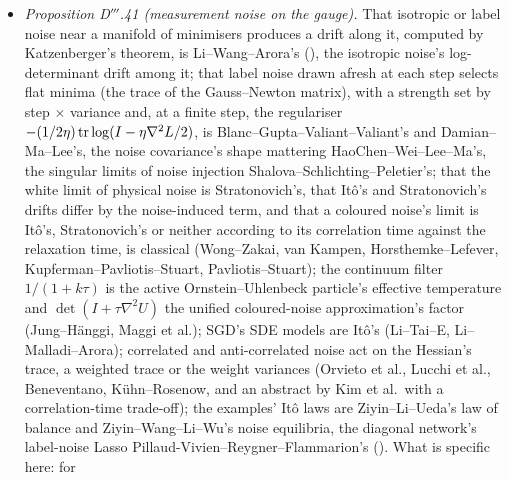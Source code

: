 \begin{itemize}
    replaces the gauge's saturation by a non-degenerate wall, so the entropic drift of
    \hyperref[res:thmDppp:37]{Proposition D$'''$.37} ends at the vertices of the representable polytope (at leading
    order: the envelope is $C^{1,1}$, so the drift's description has a boundary layer at the faces), and keeps
    \hyperref[res:thmDppp:38]{Proposition D$'''$.38}'s selection of $W^\sharp$; it leaves the deterministic objects
    inside the box unchanged, not the stationary averages, which weigh the plateau where it meets the box. Numerics:
    . Verdict: classical ingredients; the loss of dissipativity under the cohesion leak and
    its consequences for the gauge are new.
  \item \emph{Proposition D$'''$.41 (measurement noise on the gauge).} That isotropic or label noise near a manifold of
    minimisers produces a drift along it, computed by Katzenberger's theorem, is Li--Wang--Arora's (\cite{S64}), the
    isotropic noise's log-determinant drift among it; that label noise drawn afresh at each step selects flat minima
    (the trace of the Gauss--Newton matrix), with a strength set by step $\times$ variance and, at a finite step, the
    regulariser $-(1/2\eta)\operatorname{tr}\log(I - \eta\nabla^2L/2)$, is Blanc--Gupta--Valiant--Valiant's and Damian--Ma--Lee's, the
    noise covariance's shape mattering HaoChen--Wei--Lee--Ma's, the singular limits of noise injection
    Shalova--Schlichting--Peletier's; that the white limit of physical noise is Stratonovich's, that It\^o's and
    Stratonovich's drifts differ by the noise-induced term, and that a coloured noise's limit is It\^o's, Stratonovich's
    or neither according to its correlation time against the relaxation time, is classical (Wong--Zakai, van Kampen,
    Horsthemke--Lefever, Kupferman--Pavliotis--Stuart, Pavliotis--Stuart); the continuum filter $1/(1 + k\tau)$ is the
    active Ornstein--Uhlenbeck particle's effective temperature and $\det(I + \tau\nabla^2U)$ the unified coloured-noise
    approximation's factor (Jung--H\"anggi, Maggi et al.); SGD's SDE models are It\^o's (Li--Tai--E, Li--Malladi--Arora);
    correlated and anti-correlated noise act on the Hessian's trace, a weighted trace or the weight variances (Orvieto et
    al., Lucchi et al., Beneventano, K\"uhn--Rosenow, and an abstract by Kim et al.\ with a correlation-time trade-off);
    the examples' It\^o laws are Ziyin--Li--Ueda's law of balance and Ziyin--Wang--Li--Wu's noise equilibria, the
    diagonal network's label-noise Lasso Pillaud-Vivien--Reygner--Flammarion's (\cite{S69}). What is specific here: for

\end{itemize}
